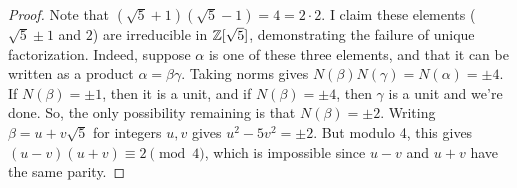 \begin{proof}
	Note that $(\sqrt{5}+1)(\sqrt{5}-1) = 4 = 2 \cdot 2$. I claim these elements ($\sqrt{5} \pm 1$ and $2$) are irreducible in $\mathbb{Z}[\sqrt{5}]$, demonstrating the failure of unique factorization. Indeed, suppose $\alpha$ is one of these three elements, and that it can be written as a product $\alpha = \beta\gamma$. Taking norms gives $N(\beta)N(\gamma) = N(\alpha) = \pm 4$. If $N(\beta) = \pm 1$, then it is a unit, and if $N(\beta) = \pm 4$, then $\gamma$ is a unit and we're done. So, the only possibility remaining is that $N(\beta) = \pm 2$. Writing $\beta = u+v\sqrt{5}$ for integers $u,v$ gives $u^2-5v^2 = \pm 2$. But modulo 4, this gives $(u-v)(u+v) \equiv 2 \pmod{4}$, which is impossible since $u-v$ and $u+v$ have the same parity.
\end{proof}
